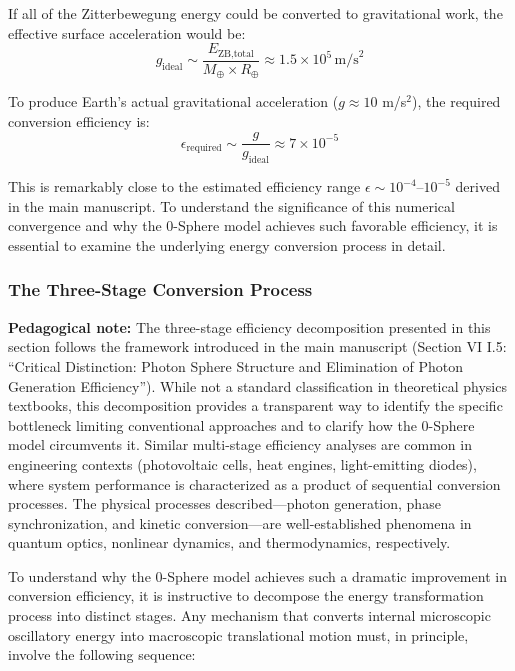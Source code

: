 \documentclass[12pt,letterpaper]{article}
\begin{document}
If all of the Zitterbewegung energy could be converted to gravitational work, the effective surface acceleration would be:
\begin{equation}
g_\text{ideal} \sim \frac{E_\text{ZB,total}}{M_\oplus \times R_\oplus} \approx 1.5 \times 10^5 \, \text{m/s}^2
\end{equation}

To produce Earth's actual gravitational acceleration ($g \approx 10$ m/s$^2$), the required conversion efficiency is:
\begin{equation}
\epsilon_\text{required} \sim \frac{g}{g_\text{ideal}} \approx 7 \times 10^{-5}
\end{equation}

This is remarkably close to the estimated efficiency range $\epsilon \sim 10^{-4}$--$10^{-5}$ derived in the main manuscript. To understand the significance of this numerical convergence and why the 0-Sphere model achieves such favorable efficiency, it is essential to examine the underlying energy conversion process in detail.



\subsubsection{The Three-Stage Conversion Process}
\label{subsubsec:three_stage}

\textbf{Pedagogical note:} The three-stage efficiency decomposition presented in this section follows the framework introduced in the main manuscript (Section VI I.5: ``Critical Distinction: Photon Sphere Structure and Elimination of Photon Generation Efficiency''). While not a standard classification in theoretical physics textbooks, this decomposition provides a transparent way to identify the specific bottleneck limiting conventional approaches and to clarify how the 0-Sphere model circumvents it. Similar multi-stage efficiency analyses are common in engineering contexts (photovoltaic cells, heat engines, light-emitting diodes), where system performance is characterized as a product of sequential conversion processes. The physical processes described—photon generation, phase synchronization, and kinetic conversion—are well-established phenomena in quantum optics, nonlinear dynamics, and thermodynamics, respectively.

To understand why the 0-Sphere model achieves such a dramatic improvement in conversion efficiency, it is instructive to decompose the energy transformation process into distinct stages. Any mechanism that converts internal microscopic oscillatory energy into macroscopic translational motion must, in principle, involve the following sequence:
\end{document}
